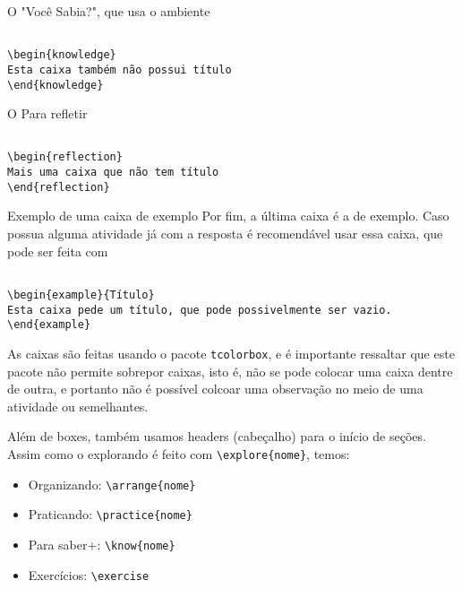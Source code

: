 \begin{knowledge}
O "Você Sabia?", que usa o ambiente

\begin{verbatim}

\begin{knowledge}
Esta caixa também não possui título
\end{knowledge}
\end{verbatim}
\end{knowledge}

\begin{reflection}
O Para refletir

\begin{verbatim}

\begin{reflection}
Mais uma caixa que não tem título
\end{reflection}
\end{verbatim}
\end{reflection}

\begin{example}{Exemplo de uma caixa de exemplo}
Por fim, a última caixa é a de exemplo. Caso possua alguma atividade já com a resposta é recomendável usar essa caixa, que pode ser feita com
\begin{verbatim}

\begin{example}{Título}
Esta caixa pede um título, que pode possivelmente ser vazio.
\end{example}
\end{verbatim}
\end{example}

\begin{observation}
As caixas são feitas usando o pacote \verb|tcolorbox|, e é importante ressaltar que este pacote não permite sobrepor caixas, isto é, não se pode colocar uma caixa dentre de outra, e portanto não é possível colcoar uma observação no meio de uma atividade ou semelhantes.
\end{observation}


Além de boxes, também usamos headers (cabeçalho) para o início de seções. Assim como o explorando é feito com \verb|\explore{nome}|, temos:

\begin{itemize}
\item Organizando: \verb|\arrange{nome}|
\item Praticando: \verb|\practice{nome}|
\item Para saber+: \verb|\know{nome}|
\item Exercícios: \verb|\exercise|
\end{itemize}

